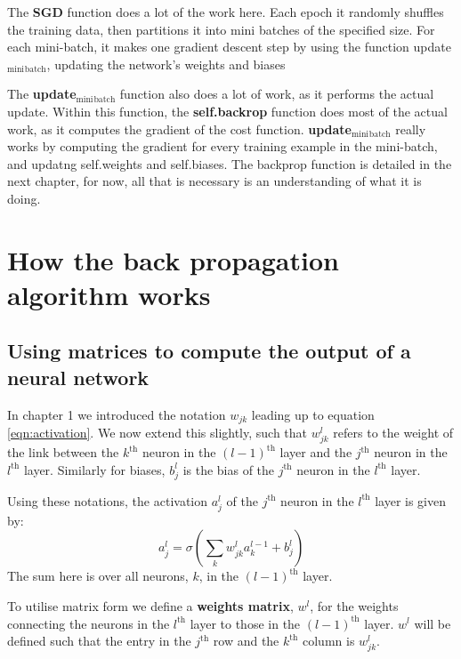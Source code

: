 \documentclass[11pt]{article}
\begin{document}
The \textbf{SGD} function does a lot of the work here. Each epoch it randomly shuffles the training data, then partitions it into mini batches of the specified size. For each mini-batch, it makes one gradient descent step by using the function update\(_{\text{mini}}\)\(_{\text{batch}}\), updating the network's weights and biases

The \textbf{update\(_{\text{mini}}\)\(_{\text{batch}}\)} function also does a lot of work, as it performs the actual update. Within this function, the \textbf{self.backrop} function does most of the actual work, as it computes the gradient of the cost function. \textbf{update\(_{\text{mini}}\)\(_{\text{batch}}\)} really works by computing the gradient for every training example in the mini-batch, and updatng self.weights and self.biases. The backprop function is detailed in the next chapter, for now, all that is necessary is an understanding of what it is doing.

\clearpage


\section{How the back propagation algorithm works}
\label{sec:orga02b322}
\subsection{Using matrices to compute the output of a neural network}
\label{sec:org6b04983}
In chapter 1 we introduced the notation \(w_{jk}\) leading up to equation \ref{eqn:activation}. We now extend this slightly, such that \(w^l_{jk}\) refers to the weight of the link between the \(k^{\text{th}}\) neuron in the \((l-1)^{\text{th}}\) layer and the \(j^{\text{th}}\) neuron in the \(l^{\text{th}}\) layer. Similarly for biases, \(b^l_j\) is the bias of the \(j^{\text{th}}\) neuron in the \(l^{\text{th}}\) layer.

Using these notations, the activation \(a^l_j\) of the \(j^{\text{th}}\) neuron in the \(l^{\text{th}}\) layer is given by:
\begin{equation} \label{eqn:alj}
a^l_j = \sigma ( \sum_k w^l_{jk} a^{l-1}_k + b^l_j )
\end{equation}
The sum here is over all neurons, \(k\), in the \((l-1)^{\text{th}}\) layer.

\vspace{0.3cm}

To utilise matrix form we define a \textbf{weights matrix}, \(w^l\), for the weights connecting the neurons in the \(l^{\text{th}}\) layer to those in the \((l-1)^{\text{th}}\) layer. \(w^l\) will be defined such that the entry in the \(j^{\text{th}}\) row and the \(k^{\text{th}}\) column is \(w^l_{jk}\).
\end{document}
